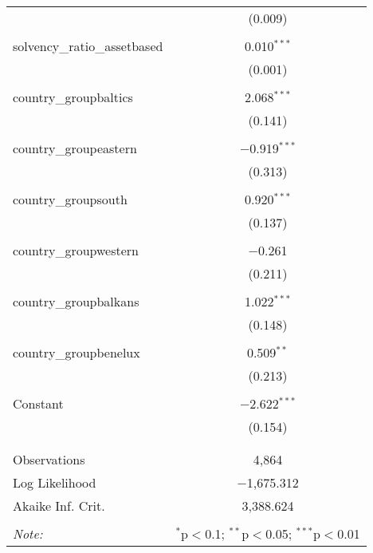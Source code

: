 \begin{table}[!htbp]
\begin{tabular}{@{\extracolsep{5pt}}lc}
  & (0.009) \\ 
  & \\ 
 solvency\_ratio\_assetbased & 0.010$^{***}$ \\ 
  & (0.001) \\ 
  & \\ 
 country\_groupbaltics & 2.068$^{***}$ \\ 
  & (0.141) \\ 
  & \\ 
 country\_groupeastern & $-$0.919$^{***}$ \\ 
  & (0.313) \\ 
  & \\ 
 country\_groupsouth & 0.920$^{***}$ \\ 
  & (0.137) \\ 
  & \\ 
 country\_groupwestern & $-$0.261 \\ 
  & (0.211) \\ 
  & \\ 
 country\_groupbalkans & 1.022$^{***}$ \\ 
  & (0.148) \\ 
  & \\ 
 country\_groupbenelux & 0.509$^{**}$ \\ 
  & (0.213) \\ 
  & \\ 
 Constant & $-$2.622$^{***}$ \\ 
  & (0.154) \\ 
  & \\ 
\hline \\[-1.8ex] 
Observations & 4,864 \\ 
Log Likelihood & $-$1,675.312 \\ 
Akaike Inf. Crit. & 3,388.624 \\ 
\hline 
\hline \\[-1.8ex] 
\textit{Note:}  & \multicolumn{1}{r}{$^{*}$p$<$0.1; $^{**}$p$<$0.05; $^{***}$p$<$0.01} \\ 
\end{tabular} 
\end{table} 
